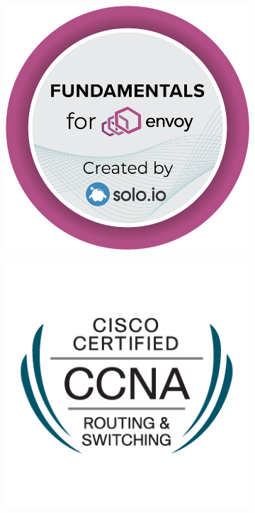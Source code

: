 \documentclass[]{friggeri-cv}
\begin{document}
\begin{figure}[h]
\begin{subfigure}[b]{0.1\linewidth}
  \end{subfigure}
  \begin{subfigure}[b]{0.1\linewidth}
    \includegraphics[width=\linewidth]{img/envoy.png}
  \end{subfigure}
  \begin{subfigure}[b]{0.1\linewidth}
    \includegraphics[width=\linewidth]{img/ccna.png}
  \end{subfigure}
\end{figure}
\end{document}
